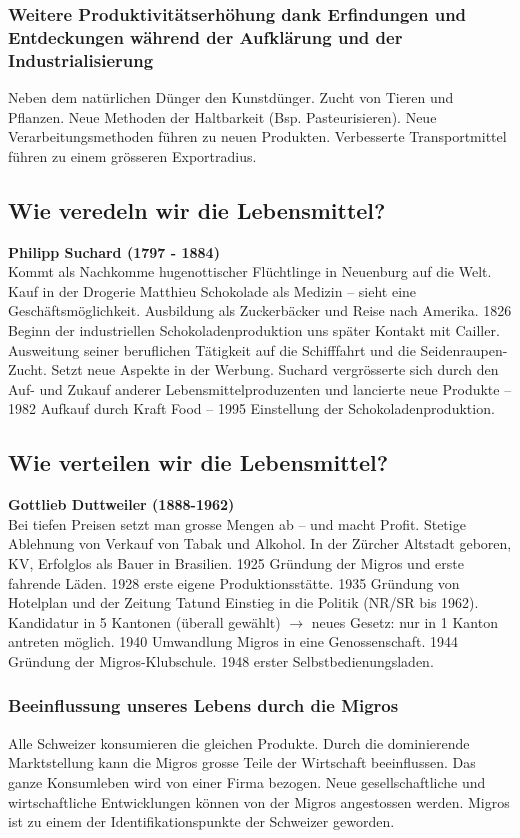 \documentclass[10pt, openright=true]{scrartcl}
\begin{document}
\subsubsection{Weitere Produktivitätserhöhung dank Erfindungen und Entdeckungen während der Aufklärung und der Industrialisierung}
Neben dem natürlichen Dünger den Kunstdünger. Zucht von Tieren und Pflanzen. Neue Methoden der Haltbarkeit (Bsp. Pasteurisieren). Neue Verarbeitungsmethoden führen zu neuen Produkten. Verbesserte Transportmittel führen zu einem grösseren Exportradius.
\subsection{Wie veredeln wir die Lebensmittel?}
\textbf{Philipp Suchard (1797 - 1884)}\\
Kommt als Nachkomme hugenottischer Flüchtlinge in Neuenburg auf die Welt. Kauf in der Drogerie Matthieu Schokolade als Medizin – sieht eine Geschäftsmöglichkeit. Ausbildung als Zuckerbäcker und Reise nach Amerika. 1826 Beginn der industriellen Schokoladenproduktion uns später Kontakt mit Cailler. Ausweitung seiner beruflichen Tätigkeit auf die Schifffahrt und die Seidenraupen-Zucht. Setzt neue Aspekte in der Werbung. Suchard vergrösserte sich durch den Auf- und Zukauf anderer Lebensmittelproduzenten und lancierte
neue Produkte – 1982 Aufkauf durch Kraft Food – 1995 Einstellung der Schokoladenproduktion.
\subsection{Wie verteilen wir die Lebensmittel?}
\textbf{Gottlieb Duttweiler (1888-1962)}\\
Bei tiefen Preisen setzt man grosse Mengen ab – und macht Profit. Stetige Ablehnung von Verkauf von Tabak und Alkohol. In der Zürcher Altstadt geboren, \glqq KV\grqq, Erfolglos als Bauer in Brasilien. 1925 Gründung der Migros und erste fahrende Läden. 1928 erste eigene Produktionsstätte. 1935 Gründung von Hotelplan und der Zeitung \glqq Tat\grqq und Einstieg in die Politik (NR/SR bis 1962). Kandidatur in 5 Kantonen (überall gewählt) $ \rightarrow $ neues Gesetz: nur in 1 Kanton antreten möglich. 1940 Umwandlung Migros in eine Genossenschaft. 1944 Gründung der Migros-Klubschule. 1948 erster Selbstbedienungsladen. 
\subsubsection{Beeinflussung unseres Lebens durch die Migros}
Alle Schweizer konsumieren die gleichen Produkte. Durch die dominierende Marktstellung kann die Migros grosse Teile der Wirtschaft beeinflussen. Das ganze Konsumleben wird von einer Firma bezogen. Neue gesellschaftliche und wirtschaftliche Entwicklungen können von der Migros angestossen werden. Migros ist zu einem der Identifikationspunkte der Schweizer geworden.
\end{document}
